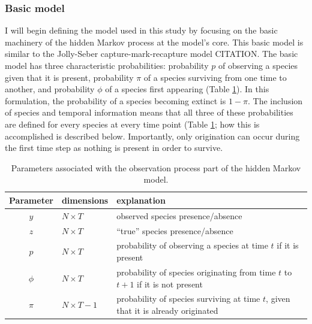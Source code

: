 \documentclass[12pt,letterpaper]{article}
\begin{document}
\subsubsection*{Basic model}
I will begin defining the model used in this study by focusing on the basic machinery of the hidden Markov process at the model's core. This basic model is similar to the Jolly-Seber capture-mark-recapture model CITATION.
The basic model has three characteristic probabilities: probability \(p\) of observing a species given that it is present, probability \(\pi\) of a species surviving from one time to another, and probability \(\phi\) of a species first appearing \citep{Royle2008} (Table \ref{tab:basic}). In this formulation, the probability of a species becoming extinct is \(1 - \pi\). The inclusion of species and temporal information means that all three of these probabilities are defined for every species at every time point (Table \ref{tab:basic}; how this is accomplished is described below. Importantly, only origination can occur during the first time step as nothing is present in order to survive.

\begin{table}
  \centering
  \caption{Parameters associated with the observation process part of the hidden Markov model.}
  \begin{tabular}{c l l}
    Parameter & dimensions & explanation \\
    \hline
    \(y\) & \(N \times T\) & observed species presence/absence \\
    \(z\) & \(N \times T\) & ``true'' species presence/absence \\
    \(p\) & \(N \times T\) & probability of observing a species at time \(t\) if it is present \\
    \(\phi\) & \(N \times T\) & probability of species originating from time \(t\) to \(t + 1\) if it is not present \\
    \(\pi\) & \(N \times T - 1\) & probability of species surviving at time \(t\), given that it is already originated \\
  \end{tabular}
  \label{tab:basic}
\end{table}
\end{document}
